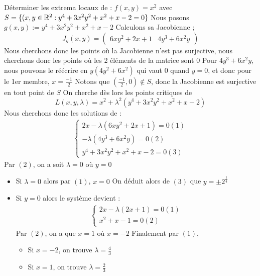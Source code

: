 \begin{exemple}\label{exo}
    Déterminer les extrema locaux de : $f(x,y) = x^2$ avec $S = \{(x,y\in\mathbb{R}^2:y^4+3x^2y^2+x^2+x-2 = 0\}$
    Nous posons $g(x,y) :=y^4+3x^2y^2+x^2+x-2$ 
    Calculons sa Jacobienne ;
    $$J_g(x,y) = \begin{pmatrix}
        6xy^2+ 2x+1 & 4y^3 +6x^2y
    \end{pmatrix}$$
    Nous cherchons donc les points où la Jacobienne n'est pas surjective, nous cherchons donc les points où les 2 éléments de la matrice sont $0$
    Pour $4y^3 +6x^2y$, nous pouvons le réécrire en $y(4y^2+6x^2)$ qui vaut $0$ quand $y = 0$, et donc pour le 1er membre, $x = \frac{-1}{2}$
    Notons que $(\frac{-1}{2},0)\notin S$, donc la Jacobienne est surjective en tout point de $S$
    On cherche dès lors les points critiques de 
    $$L(x,y,\lambda) = x^2 + \lambda^2(y^4+3x^2y^2+x^2+x-2)$$
    Nous cherchons donc les solutions de :
    \begin{align*}
        \begin{cases}
            2x-\lambda(6xy^2+2x+1) = 0 (1)\\
            -\lambda(4y^3+6x^2y) = 0(2)\\
            y^4+3x^2y^2+x^2+x-2 = 0(3)
        \end{cases}
    \end{align*}
    Par $(2)$, on a soit $\lambda = 0$ où $y = 0$
    \begin{itemize}
        \item Si $\lambda = 0$ alors par $(1)$, $x = 0$
        On déduit alors de $(3)$ que $y = \pm2^{\frac{1}{4}}$
        \item Si $y = 0$ alors le système devient :
        \begin{align*}
            \begin{cases}
                2x-\lambda(2x+1) = 0 (1)\\
                x^2 + x - 1 = 0 (2)
            \end{cases}
        \end{align*}
        Par $(2)$, on a que $x = 1$ où $x = -2$
        Finalement par $(1)$, 
        \begin{itemize}
            \item Si $x = -2$, on trouve $\lambda = \frac{4}{3}$
            \item Si $x = 1$, on trouve $\lambda = \frac{2}{3}$
        \end{itemize}
    \end{itemize}

\end{exemple}
